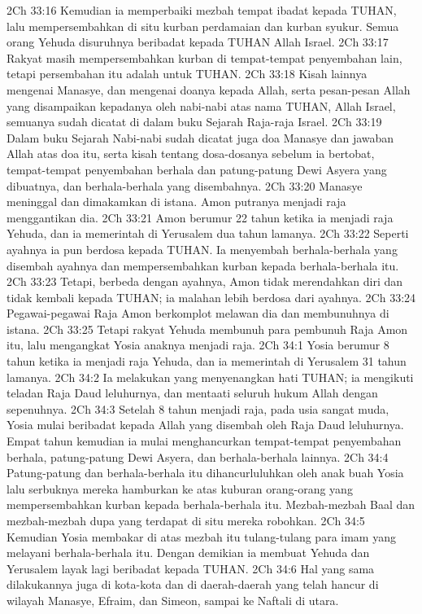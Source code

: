 2Ch 33:16  Kemudian ia memperbaiki mezbah tempat ibadat kepada TUHAN, lalu mempersembahkan di situ kurban perdamaian dan kurban syukur. Semua orang Yehuda disuruhnya beribadat kepada TUHAN Allah Israel.
2Ch 33:17  Rakyat masih mempersembahkan kurban di tempat-tempat penyembahan lain, tetapi persembahan itu adalah untuk TUHAN.
2Ch 33:18  Kisah lainnya mengenai Manasye, dan mengenai doanya kepada Allah, serta pesan-pesan Allah yang disampaikan kepadanya oleh nabi-nabi atas nama TUHAN, Allah Israel, semuanya sudah dicatat di dalam buku Sejarah Raja-raja Israel.
2Ch 33:19  Dalam buku Sejarah Nabi-nabi sudah dicatat juga doa Manasye dan jawaban Allah atas doa itu, serta kisah tentang dosa-dosanya sebelum ia bertobat, tempat-tempat penyembahan berhala dan patung-patung Dewi Asyera yang dibuatnya, dan berhala-berhala yang disembahnya.
2Ch 33:20  Manasye meninggal dan dimakamkan di istana. Amon putranya menjadi raja menggantikan dia.
2Ch 33:21  Amon berumur 22 tahun ketika ia menjadi raja Yehuda, dan ia memerintah di Yerusalem dua tahun lamanya.
2Ch 33:22  Seperti ayahnya ia pun berdosa kepada TUHAN. Ia menyembah berhala-berhala yang disembah ayahnya dan mempersembahkan kurban kepada berhala-berhala itu.
2Ch 33:23  Tetapi, berbeda dengan ayahnya, Amon tidak merendahkan diri dan tidak kembali kepada TUHAN; ia malahan lebih berdosa dari ayahnya.
2Ch 33:24  Pegawai-pegawai Raja Amon berkomplot melawan dia dan membunuhnya di istana.
2Ch 33:25  Tetapi rakyat Yehuda membunuh para pembunuh Raja Amon itu, lalu mengangkat Yosia anaknya menjadi raja.
2Ch 34:1  Yosia berumur 8 tahun ketika ia menjadi raja Yehuda, dan ia memerintah di Yerusalem 31 tahun lamanya.
2Ch 34:2  Ia melakukan yang menyenangkan hati TUHAN; ia mengikuti teladan Raja Daud leluhurnya, dan mentaati seluruh hukum Allah dengan sepenuhnya.
2Ch 34:3  Setelah 8 tahun menjadi raja, pada usia sangat muda, Yosia mulai beribadat kepada Allah yang disembah oleh Raja Daud leluhurnya. Empat tahun kemudian ia mulai menghancurkan tempat-tempat penyembahan berhala, patung-patung Dewi Asyera, dan berhala-berhala lainnya.
2Ch 34:4  Patung-patung dan berhala-berhala itu dihancurluluhkan oleh anak buah Yosia lalu serbuknya mereka hamburkan ke atas kuburan orang-orang yang mempersembahkan kurban kepada berhala-berhala itu. Mezbah-mezbah Baal dan mezbah-mezbah dupa yang terdapat di situ mereka robohkan.
2Ch 34:5  Kemudian Yosia membakar di atas mezbah itu tulang-tulang para imam yang melayani berhala-berhala itu. Dengan demikian ia membuat Yehuda dan Yerusalem layak lagi beribadat kepada TUHAN.
2Ch 34:6  Hal yang sama dilakukannya juga di kota-kota dan di daerah-daerah yang telah hancur di wilayah Manasye, Efraim, dan Simeon, sampai ke Naftali di utara.
